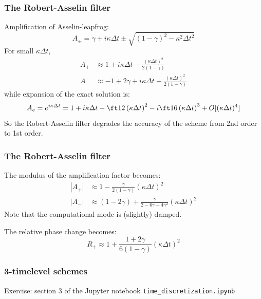 \documentclass[aspectratio=149,9pt]{beamer}
\begin{document}
%
%
%
\begin{frame}
	\frametitle{The Robert-Asselin filter}
	Amplification of Asselin-leapfrog:
	\begin{equation*}
		A_\pm = \gamma + i \kappa \Delta t \pm \sqrt{\left( 1 - \gamma \right)^2 - \kappa^2 \Delta t^2}
	\end{equation*}
	For small $\kappa \Delta t$, 
	\begin{align*}
		A_+ & \approx 1 + i \kappa \Delta t -\frac{(\kappa \Delta t)^2}{2 (1-\gamma)}	\\
		A_-	&	\approx -1+2\gamma+i\kappa\Delta t+\frac{(\kappa \Delta t)^2}{2 (1-\gamma)}
	\end{align*}
	while expansion of the exact solution is:
	\begin{equation*}
		A_e = e^{i \kappa \Delta t} = 1 +i \kappa \Delta t - \ft12 \left( \kappa \Delta t \right)^2- i \ft16 \left( \kappa \Delta t \right)^3 + O[(\kappa \Delta t)^4 ]
	\end{equation*}
	So the Robert-Asselin filter degrades the accuracy of the scheme from 2nd order to 1st order.
\end{frame}
%
%
%
\begin{frame}
	\frametitle{The Robert-Asselin filter}
	The modulus of the amplification factor becomes:
	\begin{align*}
		|A_+| &\approx 1 - \frac{\gamma}{2 (1 - \gamma)} (\kappa \Delta t)^2 \\
		|A_-| &\approx (1-2\gamma) + \frac{\gamma}{2 - 6 \gamma + 4 \gamma^2} (\kappa \Delta t)^2
	\end{align*}
	Note that the computational mode is (slightly) damped.
	\par\vspace*{2ex}
	The relative phase change becomes:
	\begin{equation*}
		R_+ \approx 1 + \frac{1+2\gamma}{6 (1-\gamma)} (\kappa \Delta t)^2
	\end{equation*}
\end{frame}
%
%
\begin{frame}
	\frametitle{3-timelevel schemes}
	Exercise: section 3 of the Jupyter notebook \texttt{time\_discretization.ipynb}
\end{frame}
%
\end{document}
